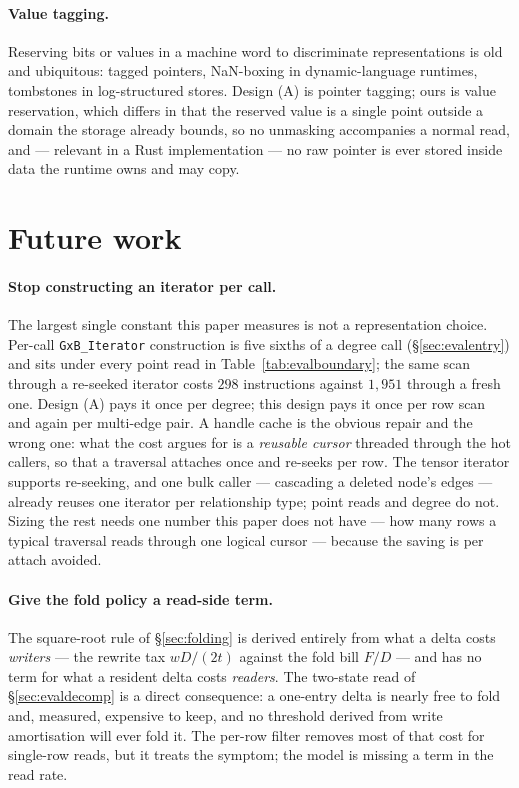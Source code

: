 \documentclass[11pt,a4paper]{article}
\theoremstyle{plain}
\theoremstyle{definition}
\theoremstyle{remark}
\begin{document}
\paragraph{Value tagging.}
Reserving bits or values in a machine word to discriminate representations is
old and ubiquitous: tagged pointers, NaN-boxing in dynamic-language runtimes,
tombstones in log-structured stores. Design (A) is pointer tagging; ours is
value reservation, which differs in that the reserved value is a single point
outside a domain the storage already bounds, so no unmasking accompanies a
normal read, and --- relevant in a Rust implementation --- no raw pointer is
ever stored inside data the runtime owns and may copy.

\section{Future work}
\label{sec:future}

\paragraph{Stop constructing an iterator per call.} The largest single constant
this paper measures is not a representation choice. Per-call
\texttt{GxB\_Iterator} construction is five sixths of a degree call
(\S\ref{sec:evalentry}) and sits under every point read in
Table~\ref{tab:evalboundary}; the same scan through a re-seeked iterator costs
$298$ instructions against $1{,}951$ through a fresh one. Design (A) pays it once
per degree; this design pays it once per row scan and again per multi-edge pair.
A handle cache is the obvious repair and the wrong one: what the cost argues for
is a \emph{reusable cursor} threaded through the hot callers, so that a traversal
attaches once and re-seeks per row. The tensor iterator supports re-seeking, and
one bulk caller --- cascading a deleted node's edges --- already reuses one
iterator per relationship type; point reads and degree do not. Sizing the rest
needs one number this paper does not have --- how many rows a typical traversal
reads through one logical cursor --- because the saving is per attach avoided.

\paragraph{Give the fold policy a read-side term.} The square-root rule of
\S\ref{sec:folding} is derived entirely from what a delta costs \emph{writers}
--- the rewrite tax $wD/(2t)$ against the fold bill $F/D$ --- and has no term
for what a resident delta costs \emph{readers}. The two-state read of
\S\ref{sec:evaldecomp} is a direct consequence: a one-entry delta is nearly free
to fold and, measured, expensive to keep, and no threshold derived from write
amortisation will ever fold it. The per-row filter removes most of that cost
for single-row reads, but it treats the symptom; the model is missing a term in
the read rate.
\end{document}
